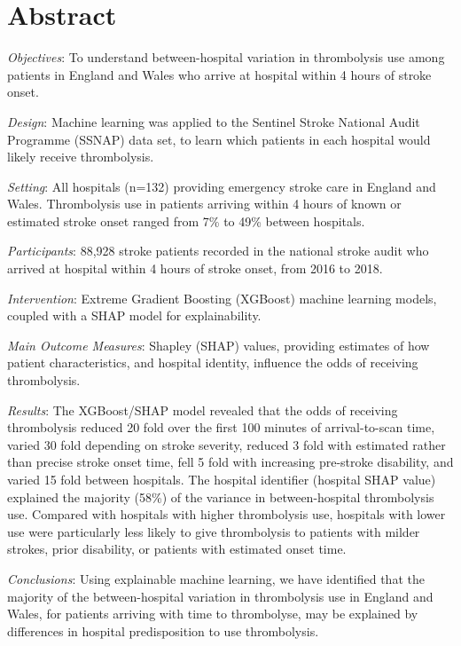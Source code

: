 \section*{Abstract}

\emph{Objectives}: To understand between-hospital variation in thrombolysis use among patients in England and Wales who arrive at hospital within 4 hours of stroke onset.

\emph{Design}: Machine learning was applied to the Sentinel Stroke National Audit Programme (SSNAP)  data set, to learn which patients in each hospital would likely receive thrombolysis.

\emph{Setting}: All hospitals (n=132) providing emergency stroke care in England and Wales. Thrombolysis use in patients arriving within 4 hours of known or estimated stroke onset ranged from 7\% to 49\% between hospitals.

\emph{Participants}: 88,928 stroke patients recorded in the national stroke audit who arrived at hospital within 4 hours of stroke onset, from 2016 to 2018.

\emph{Intervention}: Extreme Gradient Boosting (XGBoost) machine learning models, coupled with a SHAP model for explainability.

\emph{Main Outcome Measures}: Shapley (SHAP) values, providing estimates of how patient characteristics, and hospital identity, influence the odds of receiving thrombolysis.

\emph{Results}: The XGBoost/SHAP model revealed that the odds of receiving thrombolysis reduced 20 fold over the first 100 minutes of arrival-to-scan time, varied 30 fold depending on stroke severity, reduced 3 fold with estimated rather than precise stroke onset time, fell 5 fold with increasing pre-stroke disability, and varied 15 fold between hospitals. The hospital identifier (hospital SHAP value) explained the majority (58\%) of the variance in between-hospital thrombolysis use. Compared with hospitals with higher thrombolysis use, hospitals with lower use were particularly less likely to give thrombolysis to patients with milder strokes, prior disability, or patients with estimated onset time.

\emph{Conclusions}: Using explainable machine learning, we have identified that the majority of the between-hospital variation in thrombolysis use in England and Wales, for patients arriving with time to thrombolyse, may be explained by differences in hospital predisposition to use thrombolysis.